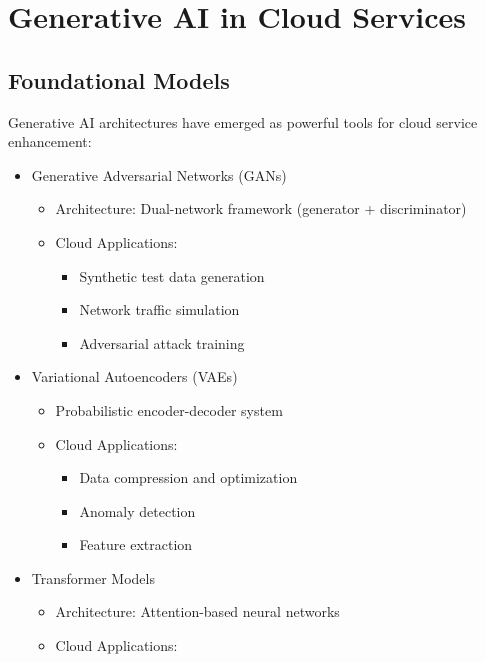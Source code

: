 \documentclass[a4paper,12pt]{article}
\begin{document}
\section{Generative AI in Cloud Services}
\subsection{Foundational Models}
Generative AI architectures have emerged as powerful tools for cloud service enhancement:
\begin{itemize}
    \item Generative Adversarial Networks (GANs)
          \begin{itemize}
              \item Architecture: Dual-network framework (generator + discriminator)
              \item Cloud Applications:
                    \begin{itemize}
                        \item Synthetic test data generation
                        \item Network traffic simulation
                        \item Adversarial attack training
                    \end{itemize}
          \end{itemize}
    \item Variational Autoencoders (VAEs)
          \begin{itemize}
              \item Probabilistic encoder-decoder system
              \item Cloud Applications:
                    \begin{itemize}
                        \item Data compression and optimization
                        \item Anomaly detection
                        \item Feature extraction
                    \end{itemize}
          \end{itemize}
    \item Transformer Models
          \begin{itemize}
              \item Architecture: Attention-based neural networks
              \item Cloud Applications:
                    \begin{itemize}

\end{itemize}
\end{itemize}
\end{itemize}
\end{document}
